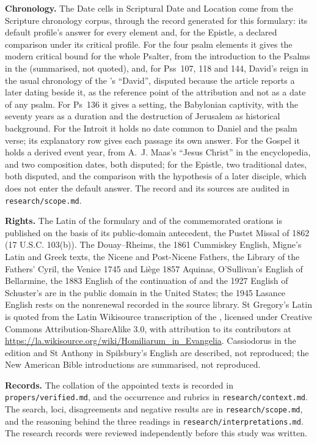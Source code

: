 {\textbf{Chronology.} The Date cells in Scriptural Date and Location come from
the Scripture chronology corpus, through the record generated for this
formulary: its default profile's answer for every element and, for the
Epistle, a declared comparison under its critical profile. For the four psalm
elements it gives the modern critical bound for the whole Psalter, from the
introduction to the Psalms in the 
(summarised, not quoted), and, for Pss~107, 118 and 144, David's reign in the
usual chronology of the 's ``David'', disputed
because the article reports a later dating beside it, as the reference point of
the attribution and not as a date of any psalm. For Ps~136 it gives a setting,
the Babylonian captivity, with the seventy years as a duration and the
destruction of Jerusalem as historical background. For the Introit it holds no
date common to Daniel and the psalm verse; its explanatory row gives each
passage its own answer. For the Gospel it holds a derived event year, from
A.~J. Maas's ``Jesus Christ'' in the encyclopedia, and two composition dates,
both disputed; for the Epistle, two traditional dates, both disputed, and the
comparison with the hypothesis of a later disciple, which does not enter the
default answer. The record and its sources are audited in
\texttt{research/scope.md}.

\textbf{Rights.} The Latin of the formulary and of the commemorated orations is
published on the basis of its public-domain antecedent, the Pustet Missal of
1862 (17 U.S.C. 103(b)). The Douay--Rheims, the 1861 Cummiskey English, Migne's
Latin and Greek texts, the Nicene and Post-Nicene Fathers, the Library of the
Fathers' Cyril, the Venice 1745 and Liège 1857 Aquinas, O'Sullivan's English
of Bellarmine, the 1883 English of the continuation of  and the 1927 English of Schuster's  are in the public
domain in the United States; the 1945 Lasance English rests on the nonrenewal
recorded in the source library. St Gregory's Latin is quoted from the Latin
Wikisource transcription of the , licensed under
Creative Commons Attribution-ShareAlike 3.0, with attribution to its
contributors at \url{https://la.wikisource.org/wiki/Homiliarum_in_Evangelia}.
Cassiodorus in the  edition and St Anthony in
Spilsbury's English are described, not reproduced; the New American Bible
introductions are summarised, not reproduced.

\textbf{Records.} The collation of the appointed texts is recorded in
\texttt{propers/verified.md}, and the occurrence and rubrics in
\texttt{research/context.md}. The search, loci, disagreements and negative
results are in \texttt{research/scope.md}, and the reasoning behind the three
readings in \texttt{research/interpretations.md}.
The research records were reviewed independently before this study was written.
\par}

